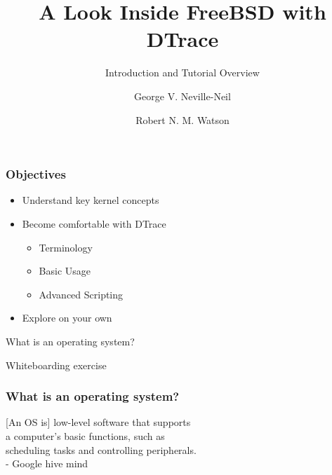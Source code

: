 \documentclass[pdftex]{beamer}
\begin{document}

\title{A Look Inside FreeBSD with DTrace}
\subtitle{Introduction and Tutorial Overview}
\author[shortname]{George V. Neville-Neil \and Robert N. M. Watson}

\begin{frame}
  \titlepage
\end{frame}

\begin{frame}
  \frametitle{Objectives}
  \begin{itemize}
  \item Understand key kernel concepts
  \item Become comfortable with DTrace
    \begin{itemize}
    \item Terminology
    \item Basic Usage
    \item Advanced Scripting
    \end{itemize}
  \item Explore on your own
  \end{itemize}
\end{frame}

%
%

\begin{frame}
  \begin{huge}
  \begin{center}
    What is an operating system?
  \end{center}
  \end{huge}

  \bigskip

  \begin{center}
  \begin{tiny}
    Whiteboarding exercise
  \end{tiny}
  \end{center}
\end{frame}

\begin{frame}
  \frametitle{What is an operating system?}

  \begin{large}
  \begin{center}
    [An OS is] low-level software that supports \\
    a computer's basic functions, such as \\
    scheduling tasks and controlling peripherals. \\
  \smallskip
  \small{- Google hive mind}
  \end{center}
  \end{large}
\end{frame}
\end{document}

